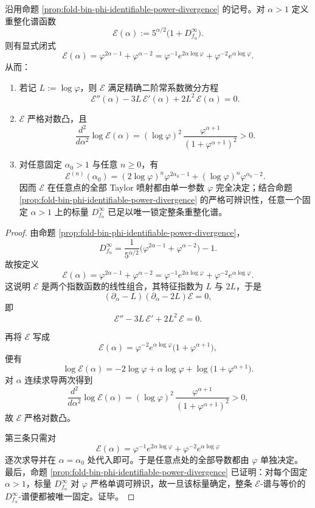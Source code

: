 \begin{theorem}\label{thm:xi-time-part9l-power-divergence-spectrum-biexponential-rigidity}
沿用命题 \ref{prop:fold-bin-phi-identifiable-power-divergence} 的记号。对 \(\alpha>1\) 定义重整化谱函数
\[
\mathcal E(\alpha):=5^{\alpha/2}\bigl(1+D_{f_\alpha}^\infty\bigr).
\]
则有显式闭式
\[
\boxed{\;
\mathcal E(\alpha)=\varphi^{2\alpha-1}+\varphi^{\alpha-2}
=
\varphi^{-1}e^{2\alpha\log\varphi}+\varphi^{-2}e^{\alpha\log\varphi}.\;}
\]
从而：
\begin{enumerate}
  \item 若记 \(L:=\log\varphi\)，则 \(\mathcal E\) 满足精确二阶常系数微分方程
  \[
  \boxed{\;
  \mathcal E''(\alpha)-3L\,\mathcal E'(\alpha)+2L^2\,\mathcal E(\alpha)=0.\;}
  \]
  \item \(\mathcal E\) 严格对数凸，且
  \[
  \boxed{\;
  \frac{d^2}{d\alpha^2}\log \mathcal E(\alpha)
  =
  (\log\varphi)^2\,
  \frac{\varphi^{\alpha+1}}{(1+\varphi^{\alpha+1})^2}>0.\;}
  \]
  \item 对任意固定 \(\alpha_0>1\) 与任意 \(n\ge 0\)，有
  \[
  \boxed{\;
  \mathcal E^{(n)}(\alpha_0)
  =
  (2\log\varphi)^n\varphi^{2\alpha_0-1}
  +(\log\varphi)^n\varphi^{\alpha_0-2}.\;}
  \]
  因而 \(\mathcal E\) 在任意点的全部 Taylor 喷射都由单一参数 \(\varphi\) 完全决定；结合命题 \ref{prop:fold-bin-phi-identifiable-power-divergence} 的严格可辨识性，任意一个固定 \(\alpha>1\) 上的标量 \(D_{f_\alpha}^\infty\) 已足以唯一锁定整条重整化谱。
\end{enumerate}
\end{theorem}
\begin{proof}
由命题 \ref{prop:fold-bin-phi-identifiable-power-divergence}，
\[
D_{f_\alpha}^\infty
=
\frac{1}{5^{\alpha/2}}
\bigl(\varphi^{2\alpha-1}+\varphi^{\alpha-2}\bigr)-1.
\]
故按定义
\[
\mathcal E(\alpha)=\varphi^{2\alpha-1}+\varphi^{\alpha-2}
=
\varphi^{-1}e^{2\alpha\log\varphi}+\varphi^{-2}e^{\alpha\log\varphi}.
\]
这说明 \(\mathcal E\) 是两个指数函数的线性组合，其特征指数为 \(L\) 与 \(2L\)，于是
\[
(\partial_\alpha-L)(\partial_\alpha-2L)\mathcal E=0,
\]
即
\[
\mathcal E''-3L\,\mathcal E'+2L^2\,\mathcal E=0.
\]

再将 \(\mathcal E\) 写成
\[
\mathcal E(\alpha)=\varphi^{-2}e^{\alpha\log\varphi}\bigl(1+\varphi^{\alpha+1}\bigr),
\]
便有
\[
\log \mathcal E(\alpha)
=
-2\log\varphi+\alpha\log\varphi+\log\bigl(1+\varphi^{\alpha+1}\bigr).
\]
对 \(\alpha\) 连续求导两次得到
\[
\frac{d^2}{d\alpha^2}\log \mathcal E(\alpha)
=
(\log\varphi)^2\,
\frac{\varphi^{\alpha+1}}{(1+\varphi^{\alpha+1})^2}>0,
\]
故 \(\mathcal E\) 严格对数凸。

第三条只需对
\[
\mathcal E(\alpha)=\varphi^{-1}e^{2\alpha\log\varphi}+\varphi^{-2}e^{\alpha\log\varphi}
\]
逐次求导并在 \(\alpha=\alpha_0\) 处代入即可。于是任意点处的全部导数都由 \(\varphi\) 单独决定。最后，命题 \ref{prop:fold-bin-phi-identifiable-power-divergence} 已证明：对每个固定 \(\alpha>1\)，标量 \(D_{f_\alpha}^\infty\) 对 \(\varphi\) 严格单调可辨识，故一旦该标量确定，整条 \(\mathcal E\)-谱与等价的 \(D_{f_\alpha}^\infty\)-谱便都被唯一固定。证毕。
\end{proof}

